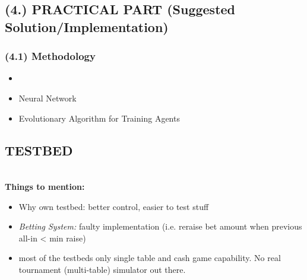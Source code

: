 \subsection{(4.) PRACTICAL PART (Suggested Solution/Implementation)} 
\subsubsection{(4.1) Methodology}
\begin{itemize}
\item {}
\item Neural Network
\item Evolutionary Algorithm for Training Agents
\end{itemize}
\pagebreak
\subsection{TESTBED}
\ \\
\textbf{Things to mention:}\\
\begin{itemize}
\item Why own testbed: 
\subitem better control, easier to test stuff
\item \textit{Betting System:} faulty implementation (i.e. reraise bet amount when previous all-in < min raise)
\item most of the testbeds only single table and cash game capability. No real tournament (multi-table) simulator out there. 
\end{itemize}
